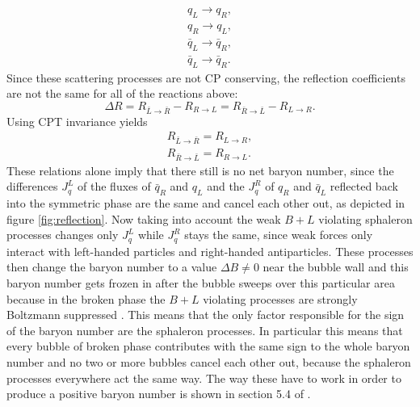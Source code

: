 \begin{align*}
	q_L\rightarrow q_R,\\
	q_R\rightarrow q_L,\\
	\bar{q}_L\rightarrow \bar{q}_R,\\
	\bar{q}_L\rightarrow \bar{q}_R.
\end{align*}
Since these scattering processes are not CP conserving, the reflection coefficients are not the same for all of the reactions above:
\begin{equation}
	\Delta R=R_{\bar{L}\rightarrow\bar{R}}-R_{R\rightarrow L}=R_{\bar{R}\rightarrow\bar{L}}-R_{L\rightarrow R}.
	\label{eq:reflection_coeff}
\end{equation}
Using CPT invariance yields
\begin{align}
	R_{\bar{L}\rightarrow\bar{R}}=R_{L\rightarrow R},\\
	R_{\bar{R}\rightarrow\bar{L}}=R_{R\rightarrow L}.
\end{align}
These relations alone imply that there still is no net baryon number, since the differences $J^L_q$ of the fluxes of $\bar{q}_R$ and $q_L$ and the  $J^R_q$ of $q_R$ and $\bar{q}_L$ reflected back into the symmetric phase are the same and cancel each other out, as depicted in figure \ref{fig:reflection}. Now taking into account the weak $B+L$ violating sphaleron processes changes only $J^L_q$ while  $J^R_q$ stays the same, since weak forces only interact with left-handed particles and right-handed antiparticles. These processes then change the baryon number to a value $\Delta B\neq$0 near the bubble wall and this baryon number gets frozen in after the bubble sweeps over this particular area because in the broken phase the $B+L$ violating processes are strongly Boltzmann suppressed \cite{Bernreuther:2002uj}. This means that the only factor responsible for the sign of the baryon number are the sphaleron processes. In particular this means that every bubble of broken phase contributes with the same sign to the whole baryon number and no two or more bubbles cancel each other out, because the sphaleron processes everywhere act the same way. The way these have to work in order to produce a positive baryon number is shown in section 5.4 of \cite{Bernreuther:2002uj}.
